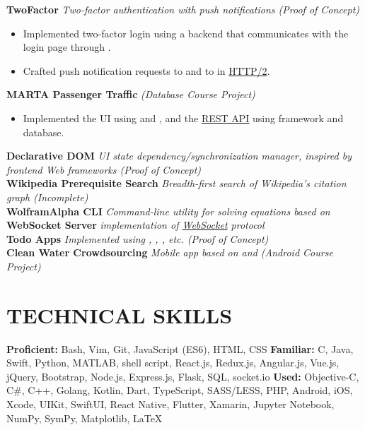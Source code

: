 \documentclass[11pt]{article}
\begin{document}
\vspace{0.5em}
%
\textbf{TwoFactor} \enspace \textit{Two-factor authentication with push notifications (Proof of Concept)}
\begin{itemize}[leftmargin=15pt, noitemsep, topsep=0pt]
\item Implemented two-factor login using a \underline{} backend that communicates with the login page through \underline{}.
\item Crafted push notification requests to \underline{} and to \underline{} in \underline{HTTP/2}.
\end{itemize}
\vspace{0.5em}
%
\textbf{MARTA Passenger Traffic} \enspace \textit{(Database Course Project)}
\begin{itemize}[leftmargin=15pt, noitemsep, topsep=0pt]
\item Implemented the UI using \underline{} and \underline{}, and the \underline{REST API} using \underline{} framework and \underline{} database.
\end{itemize}
\vspace{0.5em}
%
\textbf{Declarative DOM} \enspace \textit{UI state dependency/synchronization manager, inspired by frontend Web frameworks (Proof of Concept)}\\
\textbf{Wikipedia Prerequisite Search} \enspace \textit{Breadth-first search of Wikipedia's citation graph (Incomplete)}\\
\textbf{WolframAlpha CLI} \enspace \textit{Command-line utility for solving equations based on \underline{}}\\
\textbf{WebSocket Server}  \enspace \textit{\underline{} implementation of \underline{WebSocket} protocol}\\
\textbf{Todo Apps} \enspace \textit{Implemented using \underline{}\underline{}, \underline{}, \underline{}, etc. (Proof of Concept)}\\
\textbf{Clean Water Crowdsourcing}	\enspace \textit{Mobile app based on \underline{} and \underline{} (Android Course Project) }
\vspace{-0.5em}

\section*{TECHNICAL SKILLS}
\textbf{Proficient:} Bash, Vim, Git, JavaScript (ES6), HTML, CSS  \enspace\textbf{Familiar:} C, Java, Swift, Python, MATLAB, shell script, React.js, Redux.js, Angular.js, Vue.js, jQuery, Bootstrap, Node.js, Express.js, Flask, SQL, socket.io \enspace\textbf{Used:} Objective-C, C\#, C++, Golang, Kotlin, Dart, TypeScript, SASS/LESS, PHP, Android, iOS, Xcode, UIKit, SwiftUI, React Native, Flutter, Xamarin, Jupyter Notebook, NumPy, SymPy, Matplotlib, LaTeX
\end{document}
